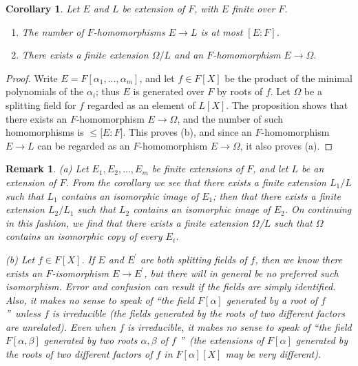 \documentclass[a4paper,11pt,final,openany]{memoir}
\newtheorem{corollary}[X]{Corollary}
\newtheorem{remark}[X]{Remark}
\theoremstyle{nonumberplain}
\newtheorem{proof}{Proof.}
\begin{document}
\begin{corollary}
\label{sf8}Let $E$ and $L$ be extension of $F$, with $E$ finite over $F$.

\begin{enumerate}
\item The number of $F$-homomorphisms $E\rightarrow L$ is at most $[E\colon
F]$.

\item There exists a finite extension $\Omega/L$ and an $F$-homomorphism
$E\rightarrow\Omega.$
\end{enumerate}
\end{corollary}

\begin{proof}
Write $E=F[\alpha_{1},\ldots,\alpha_{m}]$, and let $f\in F[X]$ be the product
of the minimal polynomials of the $\alpha_{i}$; thus $E$ is generated over $F$
by roots of $f$. Let $\Omega$ be a splitting field for $f$ regarded as an
element of $L[X]$. The proposition shows that there exists an $F$-homomorphism
$E\rightarrow\Omega$, and the number of such homomorphisms is $\leq\lbrack
E\colon F]$. This proves (b), and since an $F$-homomorphism $E\rightarrow L$
can be regarded as an $F$-homomorphism $E\rightarrow\Omega$, it also proves (a).
\end{proof}

\begin{remark}
\label{sf9}(a) Let $E_{1},E_{2},\ldots,E_{m}$ be finite extensions of $F$, and
let $L$ be an extension of $F$. From the corollary we see that there exists a
finite extension $L_{1}/L$ such that $L_{1}$ contains an isomorphic image of
$E_{1}$; then that there exists a finite extension $L_{2}/L_{1}$ such that
$L_{2}$ contains an isomorphic image of $E_{2}$. On continuing in this
fashion, we find that there exists a finite extension $\Omega$/$L$ such that
$\Omega$ contains an isomorphic copy of every $E_{i}$.

(b) Let $f\in F[X]$. If $E$ and $E^{\prime}$ are both splitting fields of $f$,
then we know there exists an $F$-isomorphism $E\rightarrow E^{\prime}$, but
there will in general be no \textit{preferred}\emph{\/} such isomorphism.
Error and confusion can result if the fields are simply identified. Also, it
makes no sense to speak of \textquotedblleft the field $F[\alpha]$ generated
by a root of $f$\textquotedblright\ unless $f$ is irreducible (the fields
generated by the roots of two different factors are unrelated). Even when $f$
is irreducible, it makes no sense to speak of \textquotedblleft the field
$F[\alpha,\beta]$ generated by two roots $\alpha,\beta$ of $f$%
\textquotedblright\ (the extensions of $F[\alpha]$ generated by the roots of
two different factors of $f$ in $F[\alpha][X]$ may be very different).
\end{remark}
\end{document}
